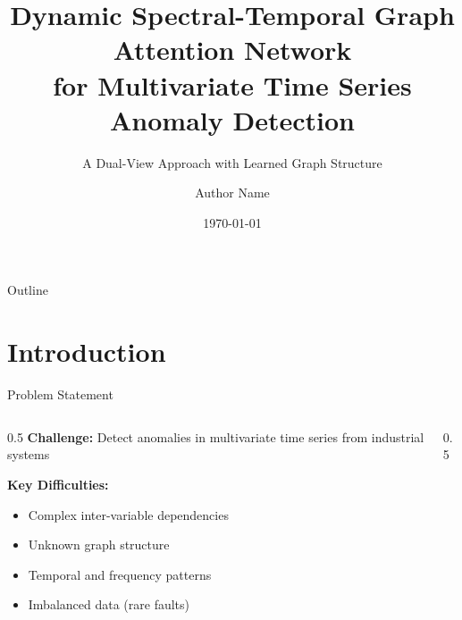 \documentclass[aspectratio=169,11pt]{beamer}
\title[DySTGAT]{Dynamic Spectral-Temporal Graph Attention Network\\for Multivariate Time Series Anomaly Detection}
\subtitle{A Dual-View Approach with Learned Graph Structure}
\author{Author Name}
\institute{Institution}
\date{\today}
\begin{document}
\begin{frame}
    \titlepage
\end{frame}

\begin{frame}{Outline}
    \tableofcontents
\end{frame}

\section{Introduction}

\begin{frame}{Problem Statement}
    \begin{columns}
        \begin{column}{0.5\textwidth}
            \textbf{Challenge:} Detect anomalies in multivariate time series from industrial systems

            \vspace{0.5cm}
            \textbf{Key Difficulties:}
            \begin{itemize}
                \item Complex inter-variable dependencies
                \item Unknown graph structure
                \item Temporal and frequency patterns
                \item Imbalanced data (rare faults)
            \end{itemize}
        \end{column}
        \begin{column}{0.5\textwidth}
        \end{column}
    \end{columns}
\end{frame}
\end{document}

